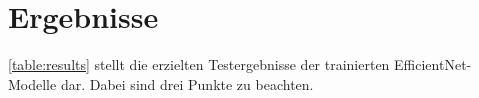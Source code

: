 \begin{description}
	

	
\end{description}


\section{Ergebnisse}

\autoref{table:results} stellt die erzielten Testergebnisse der trainierten EfficientNet-Modelle dar. Dabei sind drei Punkte zu beachten.

